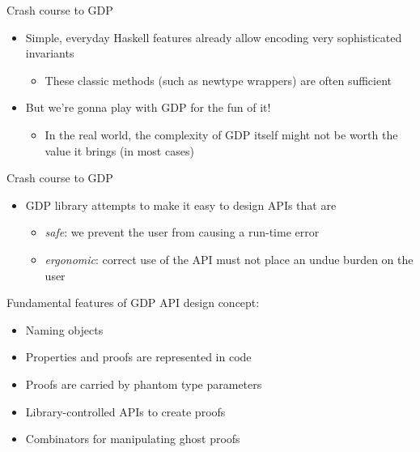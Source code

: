 \documentclass[
  9pt,
  ignorenonframetext,
]{beamer}
\providecommand{\tightlist}{%
  \setlength{\itemsep}{0pt}\setlength{\parskip}{0pt}}
\begin{document}
\begin{frame}{Crash course to GDP}
\protect\hypertarget{crash-course-to-gdp-3}{}
\begin{itemize}
\tightlist
\item
  Simple, everyday Haskell features already allow encoding very
  sophisticated invariants

  \begin{itemize}
  \tightlist
  \item
    These classic methods (such as newtype wrappers) are often
    sufficient
  \end{itemize}
\item
  But we're gonna play with GDP for the fun of it!

  \begin{itemize}
  \tightlist
  \item
    In the real world, the complexity of GDP itself might not be worth
    the value it brings (in most cases)
  \end{itemize}
\end{itemize}








\end{frame}

\begin{frame}{Crash course to GDP}
\protect\hypertarget{crash-course-to-gdp-4}{}

\begin{itemize}
\tightlist
\item
  GDP library attempts to make it easy to design APIs that are

  \begin{itemize}
  \tightlist
  \item
    \emph{safe}: we prevent the user from causing a run-time error
  \item
    \emph{ergonomic}: correct use of the API must not place an undue
    burden on the user
  \end{itemize}
\end{itemize}

Fundamental features of GDP API design concept:

\begin{itemize}
\tightlist
\item
  Naming objects
\item
  Properties and proofs are represented in code
\item
  Proofs are carried by phantom type parameters
\item
  Library-controlled APIs to create proofs
\item
  Combinators for manipulating ghost proofs
\end{itemize}












\end{frame}
\end{document}
